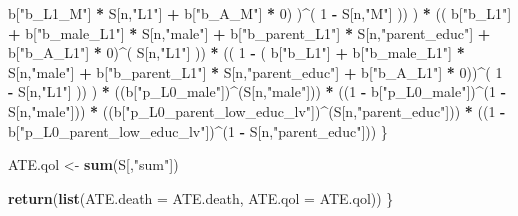 \documentclass[
]{book}
\newenvironment{Shaded}{\begin{snugshade}}{\end{snugshade}}
\newcommand{\AttributeTok}[1]{\textcolor[rgb]{0.13,0.29,0.53}{#1}}
\newcommand{\DecValTok}[1]{\textcolor[rgb]{0.00,0.00,0.81}{#1}}
\newcommand{\FunctionTok}[1]{\textcolor[rgb]{0.13,0.29,0.53}{\textbf{#1}}}
\newcommand{\NormalTok}[1]{#1}
\newcommand{\OtherTok}[1]{\textcolor[rgb]{0.56,0.35,0.01}{#1}}
\newcommand{\SpecialCharTok}[1]{\textcolor[rgb]{0.81,0.36,0.00}{\textbf{#1}}}
\newcommand{\StringTok}[1]{\textcolor[rgb]{0.31,0.60,0.02}{#1}}
\begin{document}
\begin{Shaded}
\begin{Highlighting}[]
\NormalTok{                                    b[}\StringTok{"b\_L1\_M"}\NormalTok{] }\SpecialCharTok{*}\NormalTok{ S[n,}\StringTok{"L1"}\NormalTok{] }\SpecialCharTok{+}
\NormalTok{                                    b[}\StringTok{"b\_A\_M"}\NormalTok{] }\SpecialCharTok{*} \DecValTok{0}\NormalTok{) )}\SpecialCharTok{\^{}}\NormalTok{( }\DecValTok{1} \SpecialCharTok{{-}}\NormalTok{ S[n,}\StringTok{"M"}\NormalTok{] )) ) }\SpecialCharTok{*}
\NormalTok{                        (( b[}\StringTok{"b\_L1"}\NormalTok{] }\SpecialCharTok{+}
\NormalTok{                             b[}\StringTok{"b\_male\_L1"}\NormalTok{] }\SpecialCharTok{*}\NormalTok{ S[n,}\StringTok{"male"}\NormalTok{] }\SpecialCharTok{+}  
\NormalTok{                             b[}\StringTok{"b\_parent\_L1"}\NormalTok{] }\SpecialCharTok{*}\NormalTok{ S[n,}\StringTok{"parent\_educ"}\NormalTok{] }\SpecialCharTok{+}
\NormalTok{                             b[}\StringTok{"b\_A\_L1"}\NormalTok{] }\SpecialCharTok{*} \DecValTok{0}\NormalTok{)}\SpecialCharTok{\^{}}\NormalTok{( S[n,}\StringTok{"L1"}\NormalTok{] )) }\SpecialCharTok{*}
\NormalTok{                        (( }\DecValTok{1} \SpecialCharTok{{-}}\NormalTok{ ( b[}\StringTok{"b\_L1"}\NormalTok{] }\SpecialCharTok{+}
\NormalTok{                                   b[}\StringTok{"b\_male\_L1"}\NormalTok{] }\SpecialCharTok{*}\NormalTok{ S[n,}\StringTok{"male"}\NormalTok{] }\SpecialCharTok{+}  
\NormalTok{                                   b[}\StringTok{"b\_parent\_L1"}\NormalTok{] }\SpecialCharTok{*}\NormalTok{ S[n,}\StringTok{"parent\_educ"}\NormalTok{] }\SpecialCharTok{+}
\NormalTok{                                   b[}\StringTok{"b\_A\_L1"}\NormalTok{] }\SpecialCharTok{*} \DecValTok{0}\NormalTok{))}\SpecialCharTok{\^{}}\NormalTok{( }\DecValTok{1} \SpecialCharTok{{-}}\NormalTok{ S[n,}\StringTok{"L1"}\NormalTok{] )) ) }\SpecialCharTok{*}
\NormalTok{      ((b[}\StringTok{"p\_L0\_male"}\NormalTok{])}\SpecialCharTok{\^{}}\NormalTok{(S[n,}\StringTok{"male"}\NormalTok{])) }\SpecialCharTok{*} 
\NormalTok{      ((}\DecValTok{1} \SpecialCharTok{{-}}\NormalTok{ b[}\StringTok{"p\_L0\_male"}\NormalTok{])}\SpecialCharTok{\^{}}\NormalTok{(}\DecValTok{1} \SpecialCharTok{{-}}\NormalTok{ S[n,}\StringTok{"male"}\NormalTok{])) }\SpecialCharTok{*} 
\NormalTok{      ((b[}\StringTok{"p\_L0\_parent\_low\_educ\_lv"}\NormalTok{])}\SpecialCharTok{\^{}}\NormalTok{(S[n,}\StringTok{"parent\_educ"}\NormalTok{])) }\SpecialCharTok{*}
\NormalTok{      ((}\DecValTok{1} \SpecialCharTok{{-}}\NormalTok{ b[}\StringTok{"p\_L0\_parent\_low\_educ\_lv"}\NormalTok{])}\SpecialCharTok{\^{}}\NormalTok{(}\DecValTok{1} \SpecialCharTok{{-}}\NormalTok{ S[n,}\StringTok{"parent\_educ"}\NormalTok{])) }
\NormalTok{    \}}
  
\NormalTok{  ATE.qol }\OtherTok{\textless{}{-}} \FunctionTok{sum}\NormalTok{(S[,}\StringTok{"sum"}\NormalTok{])}
  
  \FunctionTok{return}\NormalTok{(}\FunctionTok{list}\NormalTok{(}\AttributeTok{ATE.death =}\NormalTok{ ATE.death, }\AttributeTok{ATE.qol =}\NormalTok{ ATE.qol))}
\NormalTok{\}}
\end{Highlighting}
\end{Shaded}
\end{document}
